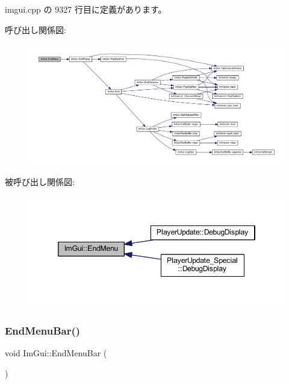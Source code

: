  imgui.\+cpp の 9327 行目に定義があります。

呼び出し関係図\+:\nopagebreak
\begin{figure}[H]
\begin{center}
\leavevmode
\includegraphics[width=350pt]{namespace_im_gui_a1448a5a4e8c431c15f991e9255c0df95_cgraph}
\end{center}
\end{figure}
被呼び出し関係図\+:\nopagebreak
\begin{figure}[H]
\begin{center}
\leavevmode
\includegraphics[width=346pt]{namespace_im_gui_a1448a5a4e8c431c15f991e9255c0df95_icgraph}
\end{center}
\end{figure}
\mbox{\label{namespace_im_gui_aa226265c140eb6ee375c5b9abc69c4fc}} 
\subsubsection{\texorpdfstring{End\+Menu\+Bar()}{EndMenuBar()}}
{\footnotesize\ttfamily void Im\+Gui\+::\+End\+Menu\+Bar (\begin{DoxyParamCaption}{ }\end{DoxyParamCaption})}



